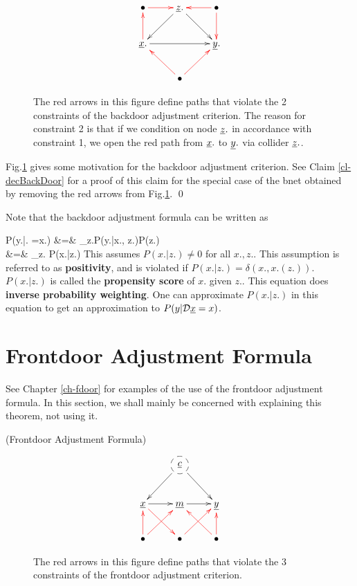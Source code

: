 \begin{figure}[h!]
$$\xymatrix
{
\bullet\ar@[red][r]
&\rvz.\ar[dl]\ar[dr]
&\bullet\ar@[red][l]\ar@[red][d]
\\
\rvx.\ar[rr]\ar@[red][u]
&&\rvy.
\\
&\bullet\ar@[red][ul]\ar@[red][ur]
}
$$
\caption{The red arrows in this figure define paths 
that violate the 2 constraints of the backdoor adjustment criterion.
 The reason for constraint 2 is that
 if we condition on node $\rvz.$
 in accordance with constraint 1, we open the
 red  path from $\rvx.$ to $\rvy.$
 via collider $\rvz.$.}
 \label{fig-bdoor-red-paths}
\end{figure}

 Fig.\ref{fig-bdoor-red-paths}
gives some motivation for the backdoor adjustment criterion.
See Claim \ref{cl-decBackDoor}
for a proof of this claim
for the
special case of the bnet
obtained by removing the red arrows from Fig.\ref{fig-bdoor-red-paths}.
\qed

Note that the backdoor adjustment  formula
can be written as

\beqa
P(y.|\cald \rvx. =x.)
&=&
\sum_{z.}P(y.|x., z.)P(z.)
\\
&=&
\sum_{z.}
{P(x.|z.)}
\eeqa
This assumes $P(x.|z.)\neq 0$
for all $x., z.$. This assumption
is referred to
as {\bf positivity},
and is violated
if $P(x.|z.)=\delta(x., x.(z.))$.
$P(x.|z.)$ is called the
{\bf propensity score}
of $x.$ given $z.$.
This
equation does
{\bf inverse probability weighting}.
One
can approximate $P(x.|z.)$
in this equation
to get
an approximation
to  $P(y|\cald\rvx=x)$.


\section{Frontdoor Adjustment Formula}
See Chapter \ref{ch-fdoor}
for examples of the use of the
frontdoor adjustment formula.
In this section,
we shall mainly be
concerned with
explaining this
theorem, not using it.

\fdoordef


\begin{claim} (Frontdoor Adjustment
Formula)

\fdoorclaim

\end{claim}
\proof
\begin{figure}[h!]
$$
\xymatrix{
&*++[F-o]{\rvc}\ar[ld]\ar[rd]
\\
\rvx\ar[r]\ar@[red][dr]
&\rvm\ar[r]
&\rvy
\\
\bullet\ar@[red][u]\ar@[red][ur]
&\bullet\ar@[red][ur]
&\bullet\ar@[red][u]\ar@[red][ul]
}
$$
\caption{The red arrows in this figure define paths 
that violate the 3 constraints of the frontdoor adjustment criterion.}
 \label{fig-fdoor-red-paths}
\end{figure}

